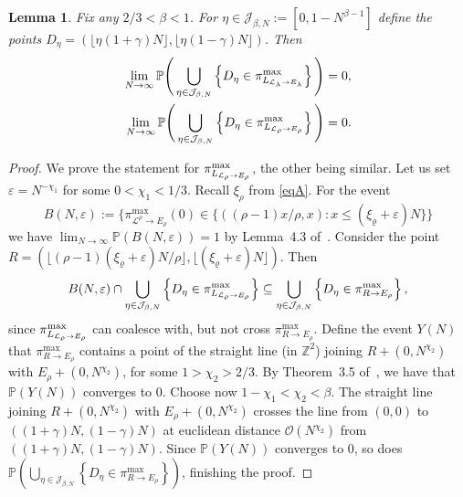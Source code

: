 \documentclass[12pt,a4paper]{article}
\numberwithin{equation}{section}
\newcommand{\Or}{\mathcal{O}}
\newcommand{\Pb}{\mathbb{P}}
\newcommand{\Z}{\mathbb{Z}}
\newtheorem{lem}[prop]{Lemma}
\begin{document}
\begin{lem}\label{Lemma3}
 Fix any $2/3<\beta<1$. For $\eta\in \mathcal{J}_{\beta,N}:=[0,1-N^{\beta-1}]$ define the points $D_\eta=(\lfloor \eta (1+\gamma) N\rfloor , \lfloor \eta(1-\gamma) N\rfloor)$. Then
\begin{equation}\label{eq:Lemma5}
 \begin{aligned}
 \lim_{N\to\infty}\Pb\Bigg(\bigcup_{\eta\in \mathcal{J}_{\beta,N}}\left\{D_\eta\in \pi^{\max}_{L_{{\cal L}_{\lambda}\to E_\lambda}}\right\}\Bigg)=0,\\
 \lim_{N\to\infty}\Pb\Bigg(\bigcup_{\eta\in \mathcal{J}_{\beta,N}}\left\{D_\eta\in \pi^{\max}_{L_{{\cal L}_{\rho}\to E_\rho}}\right\}\Bigg)=0.
 \end{aligned}
\end{equation}
\end{lem}
\begin{proof}
We prove the statement for $\pi^{\max}_{L_{{\cal L}_{\rho}\to E_\rho}}$, the other being similar.
Let us set $\varepsilon=N^{-\chi_1}$ for some $0<\chi_1<1/3$. Recall $\xi_\rho$ from \eqref{eqA}. For the event
 \begin{equation}
 B(N, \varepsilon):= \{ \pi^{\mathrm{max}}_{\mathcal{L}^{\rho}\to E_{\rho}}(0)\in \{ ((\rho-1)x/\rho, x): x \leq (\xi_\varrho+\varepsilon )N \} \}
 \end{equation}
 we have $\lim_{N \to \infty}\Pb(B(N, \varepsilon))=1$ by Lemma~4.3 of~\cite{FO17v1}. Consider the point \mbox{$R=(\lfloor (\rho-1)(\xi_\varrho+\varepsilon )N/\rho\rfloor, \lfloor (\xi_\varrho+\varepsilon )N\rfloor)$}.
 Then
 \begin{equation}
 B(N, \varepsilon)\cap \bigcup_{\eta\in \mathcal{J}_{\beta,N}}\left\{D_\eta\in \pi^{\max}_{L_{{\cal L}_{\rho}\to E_\rho}}\right\}\subseteq \bigcup_{\eta\in \mathcal{J}_{\beta,N}}\left\{D_\eta\in \pi^{\max}_{R\to E_\rho}\right\},
 \end{equation}
since $ \pi^{\max}_{L_{{\cal L}_{\rho}\to E_\rho}}$ can coalesce with, but not cross $ \pi^{\max}_{R\to E_\rho}$.
Define the event $Y(N)$ that $\pi^{\max}_{R\to E_\rho}$ contains a point of the straight line (in $\Z^{2}$) joining $R+(0,N^{\chi_2})$ with $E_\rho+(0,N^{\chi_2})$, for some $1>\chi_2>2/3$. By Theorem~3.5 of~\cite{N17}, we have that $\Pb(Y(N))$ converges to $0$.
Choose now $1-\chi_1<\chi_2<\beta$. The straight line joining $R+(0,N^{\chi_2})$ with $E_\rho+(0,N^{\chi_2})$ crosses the line from $(0,0)$ to $((1+\gamma) N,(1-\gamma)N)$ at euclidean distance $\Or(N^{\chi_2})$ from $ ((1+\gamma) N,(1-\gamma)N)$. Since $\Pb(Y(N))$ converges to $0$, so does $\Pb\left( \bigcup_{\eta\in \mathcal{J}_{\beta,N}}\left\{D_\eta\in \pi^{\max}_{R\to E_\rho}\right\}\right)$, finishing the proof.
\end{proof}
\end{document}
